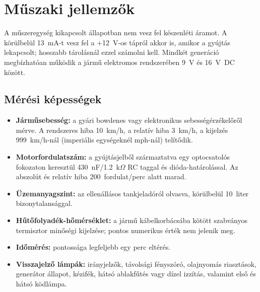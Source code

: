\chapter{Műszaki jellemzők}\label{ch:technical-specs}

A \ReplicaGenOne{} műszeregység kikapcsolt állapotban nem vesz fel készenléti áramot. A \ReplicaNextShort{} körülbelül 13~mA-t vesz fel a +12~V-os tápról akkor is, amikor a gyújtás lekapcsolt; hosszabb tárolásnál ezzel számolni kell. Mindkét generáció megbízhatóan működik a jármű elektromos rendszerében 9~V és 16~V~DC között.

\section{Mérési képességek}
\begin{itemize}
    \item \textbf{Járműsebesség:} a gyári bowdenes vagy elektronikus sebességérzékelőről mérve. A rendszeres hiba 10~km/h, a relatív hiba 3~km/h, a kijelzés 999~km/h-nál (imperiális egységeknél mph-nál) telítődik.
    \item \textbf{Motorfordulatszám:} a gyújtásjelből származtatva egy optocsatolós fokozaton keresztül 430~nF/1.2~k\ensuremath{\Omega} RC taggal és dióda-határolással. Az abszolút és relatív hiba 200~fordulat/perc alatt marad.
    \item \textbf{Üzemanyagszint:} az ellenállásos tankjeladóról olvasva, körülbelül 10~liter bizonytalansággal.
    \item \textbf{Hűtőfolyadék-hőmérséklet:} a jármű kábelkorbácsába kötött szabványos termisztor minőségi kijelzése; pontos numerikus érték nem jelenik meg.
    \item \textbf{Időmérés:} pontossága legfeljebb egy perc eltérés.
    \item \textbf{Visszajelző lámpák:} irányjelzők, távolsági fényszóró, olajnyomás riasztások, generátor állapot, kézifék, hátsó ablakfűtés vagy dízel izzítás, valamint első és hátsó ködlámpa.
\end{itemize}
